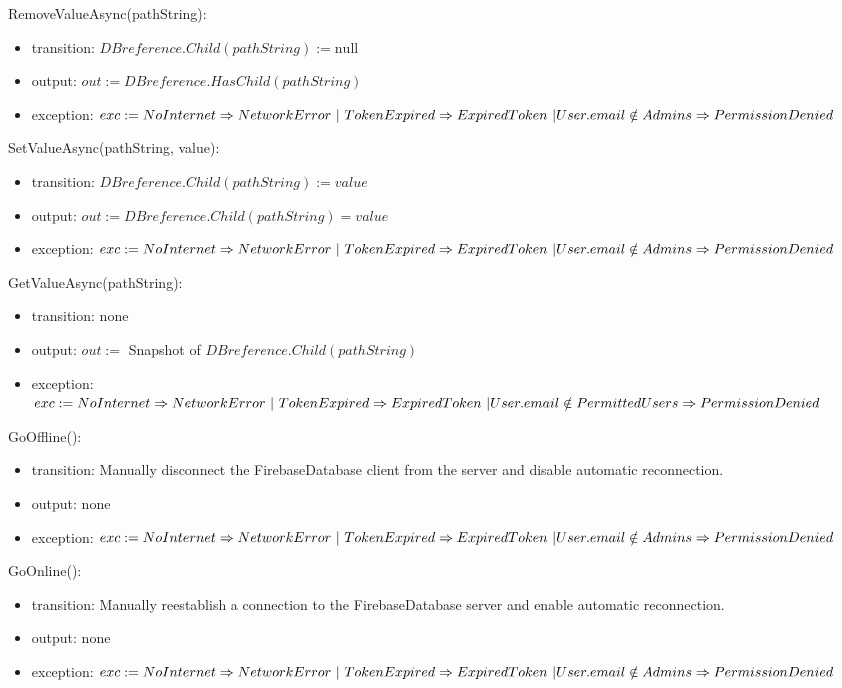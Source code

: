 \documentclass[12pt, titlepage]{article}
\begin{document}
\noindent RemoveValueAsync(pathString):
\begin{itemize}
\item transition: $DBreference.Child(pathString) := \text{null}$
\item output: $out := DBreference.HasChild(pathString)$
\item exception: $exc := NoInternet \Rightarrow NetworkError\ | \ TokenExpired \Rightarrow ExpiredToken\ | \\ User.email \notin Admins \Rightarrow PermissionDenied$
\end{itemize}

\noindent SetValueAsync(pathString, value):
\begin{itemize}
\item transition: $DBreference.Child(pathString) := value$
\item output: $out := DBreference.Child(pathString) = value$
\item exception: $exc := NoInternet \Rightarrow NetworkError\ | \ TokenExpired \Rightarrow ExpiredToken\ | \\ User.email \notin Admins \Rightarrow PermissionDenied$
\end{itemize}

\noindent GetValueAsync(pathString):
\begin{itemize}
\item transition: none
\item output: $out :=$ Snapshot of $DBreference.Child(pathString)$
\item exception: $exc := NoInternet \Rightarrow NetworkError\ | \ TokenExpired \Rightarrow ExpiredToken\ | \\ User.email \notin PermittedUsers \Rightarrow PermissionDenied$
\end{itemize}

\noindent GoOffline():
\begin{itemize}
\item transition: Manually disconnect the FirebaseDatabase client from the server and disable automatic reconnection.
\item output: none
\item exception: $exc := NoInternet \Rightarrow NetworkError\ | \ TokenExpired \Rightarrow ExpiredToken\ | \\ User.email \notin Admins \Rightarrow PermissionDenied$
\end{itemize}

\noindent GoOnline():
\begin{itemize}
\item transition: Manually reestablish a connection to the FirebaseDatabase server and enable automatic reconnection.
\item output: none
\item exception: $exc := NoInternet \Rightarrow NetworkError\ | \ TokenExpired \Rightarrow ExpiredToken\ | \\ User.email \notin Admins \Rightarrow PermissionDenied$
\end{itemize}
\end{document}
